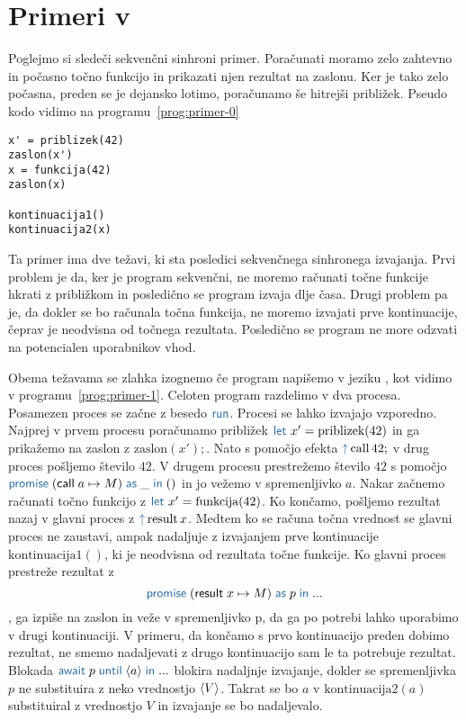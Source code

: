 \section{Primeri v \aeff{}} \label{sec:primeri-aeff}

Poglejmo si sledeči sekvenčni sinhroni primer. Poračunati moramo zelo zahtevno in počasno točno funkcijo in prikazati njen rezultat na zaslonu. Ker je tako zelo počasna, preden se je dejansko lotimo, poračunamo še hitrejši približek. Pseudo kodo vidimo na programu~\ref{prog:primer-0}

\begin{lstlisting}[caption={Sinhron sekvečni primer.},label={prog:primer-0},float,floatplacement=h]
x' = priblizek(42)
zaslon(x')
x = funkcija(42)
zaslon(x)

kontinuacija1()
kontinuacija2(x)
\end{lstlisting}

Ta primer ima dve težavi, ki sta posledici sekvenčnega sinhronega izvajanja. Prvi problem je da, ker je program sekvenčni, ne moremo računati točne funkcije hkrati z približkom in posledično se program izvaja dlje časa. Drugi problem pa je, da dokler se bo računala točna funkcija, ne moremo izvajati prve kontinuacije, čeprav je neodvisna od točnega rezultata. Posledično se program ne more odzvati na potencialen uporabnikov vhod.  

Obema težavama se zlahka izognemo če program napišemo v jeziku \aeff, kot vidimo v programu~\ref{prog:primer-1}. Celoten program razdelimo v dva procesa. Posamezen proces se začne z besedo $\tmkw{run}$. Procesi se lahko izvajajo vzporedno. Najprej v prvem procesu poračunamo približek $\tmkw{let}\ x' = \text{priblizek}(42)$ in ga prikažemo na zaslon z $\text{zaslon}(x');$. Nato s pomočjo efekta $\tmkw{\uparrow}\, \text{call}\,42;$ v drug proces pošljemo število $42$. V drugem procesu prestrežemo število $42$ s pomočjo $\tmwith{call}{a}{M}{\_}{()}$ in jo vežemo v spremenljivko $a$. Nakar začnemo računati točno funkcijo z $\tmkw{let}\ x' = \text{funkcija}(42)$. Ko končamo, pošljemo rezultat nazaj v glavni proces z $\tmkw{\uparrow}\, \text{result}\,x$. Medtem ko se računa točna vrednost se glavni proces ne zaustavi, ampak nadaljuje z izvajanjem prve kontinuacije $\text{kontinuacija}1()$, ki je neodvisna od rezultata točne funkcije. Ko glavni proces prestreže rezultat z $$\tmwith{result}{x}{M}{p}{...}$$, ga izpiše na zaslon in veže v spremenljivko p, da ga po potrebi lahko uporabimo v drugi kontinuaciji. V primeru, da končamo s prvo kontinuacijo preden dobimo rezultat, ne smemo nadaljevati z drugo kontinuacijo sam le ta potrebuje rezultat. Blokada $\tmawait{p}{a}{...}$ blokira nadaljnje izvajanje, dokler se spremenljivka $p$ ne substituira z neko vrednostjo $\langle V \rangle$. Takrat se bo $a$ v $\text{kontinuacija}2(a)$ substituiral z vrednostjo $V$ in izvajanje se bo nadaljevalo.

